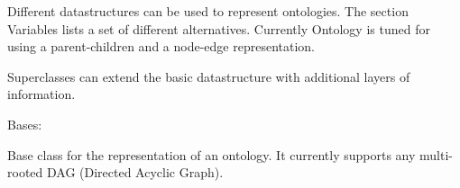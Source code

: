 \documentclass[letterpaper,10pt,english]{sphinxmanual}
\begin{document}
Different datastructures can be used to represent ontologies. The section Variables lists a set of different alternatives. Currently Ontology is tuned for using a parent-children and a node-edge representation.

Superclasses can extend the basic datastructure with additional layers of information.

\begin{fulllineitems}
\label{fastsemsim.Ontology:fastsemsim.Ontology.Ontology.Ontology}
Bases: 

Base class for the representation of an ontology. It currently supports any multi-rooted DAG (Directed Acyclic Graph).

\begin{fulllineitems}
\label{fastsemsim.Ontology:fastsemsim.Ontology.Ontology.Ontology.debug}
\end{fulllineitems}


\begin{fulllineitems}
\label{fastsemsim.Ontology:fastsemsim.Ontology.Ontology.Ontology.det_roots}
\end{fulllineitems}


\begin{fulllineitems}
\label{fastsemsim.Ontology:fastsemsim.Ontology.Ontology.Ontology.edge_number}
\end{fulllineitems}


\begin{fulllineitems}
\label{fastsemsim.Ontology:fastsemsim.Ontology.Ontology.Ontology.gen_error}
\end{fulllineitems}



\end{fulllineitems}
\end{document}
